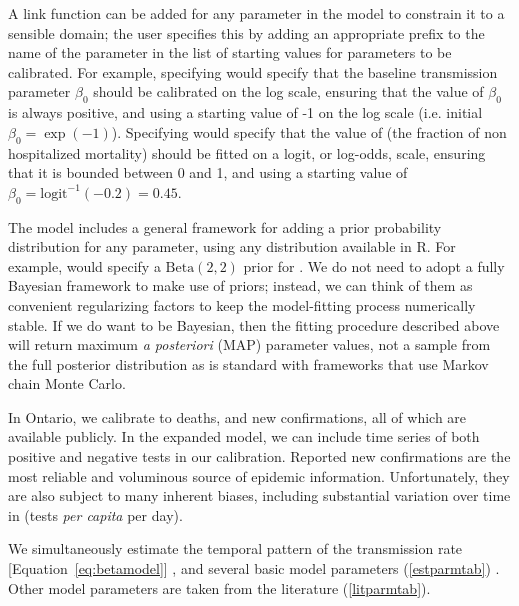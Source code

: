 \documentclass[12pt]{article}\usepackage[]{graphicx}\usepackage[]{color}
\begin{document}
A link function can be added for any parameter in the model to constrain it to a sensible domain; the user specifies this by adding an appropriate prefix to the name of the parameter in the list of starting values for parameters to be calibrated. 
For example, specifying  would specify that the baseline transmission parameter $\beta_0$ should be calibrated on the log scale, ensuring that the value of $\beta_0$ is always positive, and using a starting value of -1 on the log scale (i.e. initial $\beta_0 = \exp(-1)$). 
Specifying  would specify that the value of  (the fraction of non hospitalized mortality) should be fitted on a logit, or log-odds, scale, ensuring that it is bounded between 0 and 1, and using a starting value of $\beta_0 = \textrm{logit}^{-1}(-0.2) = 0.45$.

The model includes a general framework for adding a prior probability distribution for any parameter, using any distribution available in R. 
For example,  would specify a $\textrm{Beta}(2,2)$ prior for .
We do not need to adopt a fully Bayesian framework to make use of priors; instead, we can think of them as convenient regularizing factors to keep the model-fitting process numerically stable. If we do want to be Bayesian, then the fitting procedure described above will return maximum \emph{a posteriori} (MAP) parameter values, not a sample from the full posterior distribution as is standard with frameworks that use Markov chain Monte Carlo.


In Ontario, we calibrate to deaths, and new confirmations, all of which are available publicly. 
In the expanded model, we can include time series of both positive and negative tests in our calibration. 
Reported new confirmations are the most reliable and voluminous source of epidemic information.
Unfortunately, they are also subject to many inherent biases, including substantial variation over time in  (\ie tests \emph{per capita} per day).

We simultaneously estimate the temporal pattern of the transmission rate [Equation~\eqref{eq:betamodel}] , and several basic model parameters (\cref{estparmtab}) .
Other model parameters are taken from the literature (\cref{litparmtab}).
\end{document}

